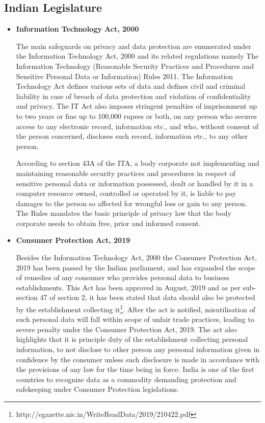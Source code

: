 \begin{multicols}{2}
\section{Indian Legislature}

\begin{itemize}

\item[{\bf 1.}] \textbf{Information Technology Act, 2000}

The main safeguards on privacy and data protection are enumerated under the Information Technology Act, 2000 and its related regulations namely The Information Technology (Reasonable Security Practices and Procedures and Sensitive Personal Data or Information) Rules 2011. The Information Technology Act defines various sets of data and defines civil and criminal liability in case of breach of data protection and violation of confidentiality and privacy. The IT Act also imposes stringent penalties of imprisonment up to two years or fine up to 100,000 rupees or both, on any person who secures access to any electronic record, information etc., and who, without consent of the person concerned, discloses such record, information etc., to any other person.

According to section 43A of the ITA, a body corporate not implementing and maintaining reasonable security practices and procedures in respect of sensitive personal data or information possessed, dealt or handled by it in a computer resource owned, controlled or operated by it, is liable to pay damages to the person so affected for wrongful loss or gain to any person. The Rules mandates the basic principle of privacy law that the body corporate needs to obtain free, prior and informed consent.

\item[{\bf 2.}]\textbf{Consumer Protection Act, 2019}

\vskip 0.18cm

Besides the Information Technology Act, 2000 the Consumer Protection Act, 2019 has been passed by the Indian parliament, and has expanded the scope of remedies of any consumer who provides personal data to business establishments. This Act has been approved in August, 2019 and as per sub-section 47 of section 2, it has been stated that data should also be protected by the establishment collecting it\footnote{http://egazette.nic.in/WriteReadData/2019/210422.pdf}. After the act is notified, misutilisation of such personal data will fall within scope of unfair trade practices, leading to severe penalty under the Consumer Protection Act, 2019. The act also highlights that it is principle duty of the establishment collecting personal information, to not disclose to other person any personal information given in confidence by the consumer unless such disclosure is made in accordance with the provisions of any law for the time being in force. India is one of the first countries to recognize data as a commodity demanding protection and safekeeping under Consumer Protection legislations.


\end{itemize}
\end{multicols}
